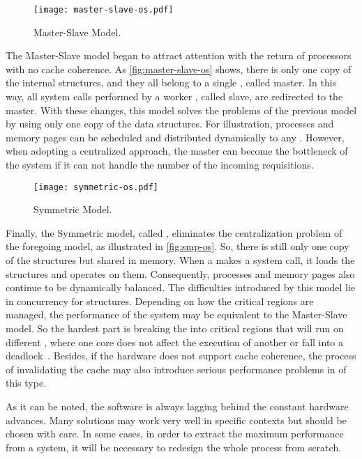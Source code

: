 			\begin{figure}[!tb]
				\centering%
				\caption{Master-Slave \os Model.}%
				\label{fig:master-slave-os}%
				\texttt{[image: master-slave-os.pdf]}%
			\end{figure}

			The Master-Slave model began to attract attention with the return of
			processors with no cache coherence.
			As \autoref{fig:master-slave-os} shows, there is only one copy of
			the internal \os structures, and they all belong to a single \cpu, called master.
			In this way, all system calls performed by a worker \cpu, called slave,
			are redirected to the master.
			With these changes, this model solves the problems of the previous model
			by using only one copy of the data structures.
			For illustration, processes and memory pages can be scheduled and
			distributed dynamically to any \cpus.
			However, when adopting a centralized approach, the master can become
			the bottleneck of the system if it can not handle the number of the
			incoming requisitions.

			\begin{figure}[!tb]
				\centering%
				\caption{Symmetric \os Model.}%
				\label{fig:smp-os}%
				\texttt{[image: symmetric-os.pdf]}%
			\end{figure}

			Finally, the Symmetric model, called \smp, eliminates the centralization
			problem of the foregoing model, as illustrated in \autoref{fig:smp-os}.
			So, there is still only one copy of the \os structures but shared in memory.
			When a \cpu makes a system call, it loads the structures and operates on them.
			Consequently, processes and memory pages also continue to be dynamically balanced.
			The difficulties introduced by this model lie in concurrency for \os structures.
			Depending on how the critical regions are managed, the performance of the system
			may be equivalent to the Master-Slave model. So the hardest part is breaking the
			\os into critical regions that will run on different \cpus, where one core does
			not affect the execution of another or fall into a deadlock~\cite{tanenbaum:4ed}.
			Besides, if the hardware does not support cache coherence, the process of
			invalidating the cache may also introduce serious performance problems in \oss of this type.

			As it can be noted, the software is always lagging behind the constant hardware advances.
			Many solutions may work very well in specific contexts but should be chosen with care.
			In some cases, in order to extract the maximum performance from a system, it will be
			necessary to redesign the whole process from scratch.

